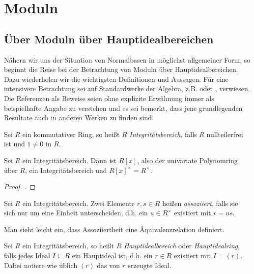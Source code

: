 \chapter{Moduln}
\label{chap:moduln}

\section{Über Moduln über Hauptidealbereichen}
\label{sec:Moduln}

Nähern wir uns der Situation von Normalbasen in möglichst allgemeiner Form, so
beginnt die Reise bei der Betrachtung von Moduln über Hauptidealbereichen. Dazu
wiederholen wir die wichtigsten Definitionen und Aussagen. Für eine intensivere
Betrachtung sei auf Standardwerke der Algebra, z.B. 
\autocite{lang2002algebra} oder \autocite{hartley1974rings}, verwiesen.
Die Referenzen als Beweise seien ohne explizite Erwähnung immer 
als beispielhafte Angabe zu verstehen und es
sei bemerkt, dass jene grundlegenden Resultate auch in anderen Werken zu 
finden sind.

\begin{definition}[Integritätsbereich]
  Sei $R$ ein kommutativer Ring, so heißt $R$ \emph{Integritätsbereich},
  falls $R$ nullteilerfrei ist und $1\neq 0$ in $R$.
\end{definition}

\begin{lemma}
  Sei $R$ ein Integritätsbereich. Dann ist $R[x]$, also der 
  univariate Polynomring über $R$, ein Integritätsbereich und
  $R[x]^\times = R^\times$.
\end{lemma}
\begin{proof}
  \autocite[Lemma 13.4]{karpfinger2010algebra}.
\end{proof}

\begin{definition}
  Sei $R$ ein Integritätsbereich. Zwei Elemente $r,s\in R$ heißen 
  \emph{assoziiert}, falls sie sich nur um eine Einheit unterscheiden, d.h. ein
  $u \in R^\times$ existiert mit $r = us$.
\end{definition}

\begin{bemerkung}
  Man sieht leicht ein, dass Assoziiertheit eine Äquivalenzrelation definiert.
\end{bemerkung}

\begin{definition}[Hauptidealbereich]
  Sei $R$ ein Integritätsbereich, so heißt $R$ \emph{Hauptidealbereich}
  oder \emph{Hauptidealring}, falls jedes Ideal $I\subseteq R$ ein
  Hauptideal ist, d.h. ein $r \in R$ existiert mit
  $I = (r)$. Dabei notiere wie üblich $(r)$ das von $r$ erzeugte Ideal.
\end{definition}


